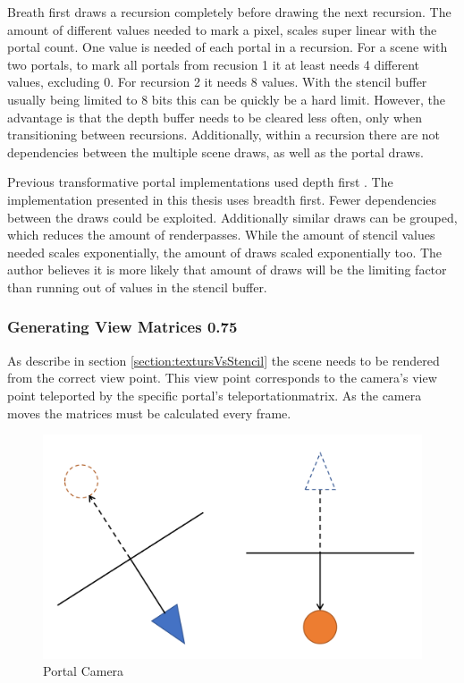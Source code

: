 Breath first draws a recursion completely before drawing the next recursion. The amount of different values needed to mark a pixel, scales super linear with the portal count. One value is needed of each portal in a recursion. For a scene with two portals, to mark all portals from recusion 1 it at least needs 4 different values, excluding 0. For recursion 2 it needs 8 values. With the stencil buffer usually being limited to 8 bits this can be quickly be a hard limit. However, the advantage is that the depth buffer needs to be cleared less often, only when transitioning between recursions. Additionally, within a recursion there are not dependencies between the multiple scene draws, as well as the portal draws.

Previous transformative portal implementations used depth first \cite{lowe:2005:technique,lecture:portalProblems}. The implementation presented in this thesis uses breadth first. Fewer dependencies between the draws could be exploited. Additionally similar draws can be grouped, which reduces the amount of renderpasses. While the amount of stencil values needed scales exponentially, the amount of draws scaled exponentially too. The author believes it is more likely that amount of draws will be the limiting factor than running out of values in the stencil buffer.



\subsubsection{Generating View Matrices 0.75}
\label{section:generatingviewmatrices}
As describe in section \ref{section:textursVsStencil} the scene needs to be rendered from the correct view point. This view point corresponds to the camera's view point teleported by the specific portal's \gls{teleportationmatrix}. As the camera moves the matrices must be calculated every frame.

\begin{figure}[h]
	\includegraphics[width=\linewidth]{images/camera_matrices.png}
	\caption{Portal Camera}
	\label{fig:cameramatrices}
\end{figure}

